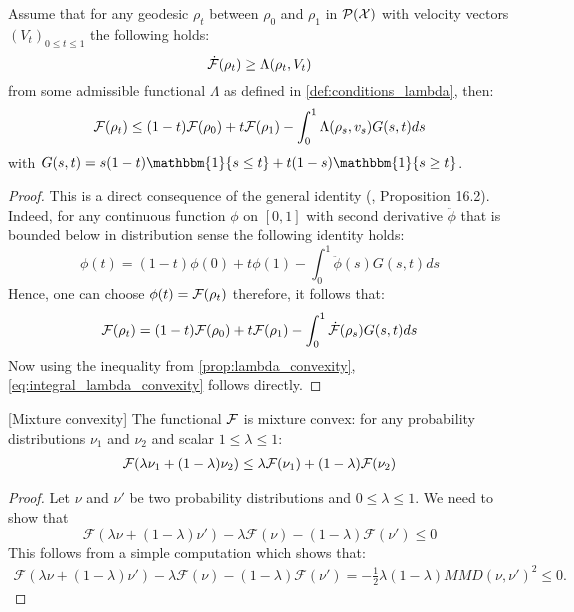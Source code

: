 \begin{lemma}\label{lem:integral_lambda_convexity}
Assume that for any geodesic $\rho_{t}$ between
$\rho_{0}$ and $\rho_{1}$ in $\mathcal{P}({{\mathcal X}})$ with velocity vectors $(V_t)_{0\leq t\leq 1}$ the following holds:
\[
\dot{{{\mathcal F}}}(\rho_{t}) \geq \Lambda(\rho_t,V_t)
\]
from some admissible functional $\Lambda$ as defined in \cref{def:conditions_lambda}, then:
\begin{equation}
{{\mathcal F}}(\rho_{t})\leq(1-t){{\mathcal F}}(\rho_{0})+t{{\mathcal F}}(\rho_{1})-\int_{0}^{1}\Lambda(\rho_{s},v_{s})G(s,t)ds\label{eq:integral_lambda_convexity}
\end{equation}
with $G(s,t)=s(1-t) \mathbbm{1}\{s\leq t\}
+t(1-s) \mathbbm{1}\{s\geq t\}$.

\end{lemma}
\begin{proof}
	This is a direct consequence of the general identity (\cite{Villani:2009},
	Proposition 16.2). Indeed, for any continuous function $\phi$ on
	$[0,1]$ with second derivative $\ddot{\phi}$ that is bounded below
	in distribution sense the following identity holds:
	\[
	\phi(t)=(1-t)\phi(0)+t\phi(1)-\int_{0}^{1}\ddot{\phi}(s)G(s,t)ds
	\]
	Hence, one can choose $\phi(t)={{\mathcal F}}(\rho_{t})$ therefore, 
	it follows that:
	\[
	{{\mathcal F}}(\rho_{t})=(1-t){{\mathcal F}}(\rho_{0})+t{{\mathcal F}}(\rho_{1})-\int_{0}^{1}\dot{{{\mathcal F}}}(\rho_{s})G(s,t)ds
	\]
	Now using the inequality from \cref{prop:lambda_convexity}, \cref{eq:integral_lambda_convexity}
	follows directly. 
\end{proof}


\begin{lemma}\label{lem:mixture_convexity}[Mixture convexity]
	The functional ${{\mathcal F}}$ is mixture convex: for any probability distributions $\nu_1$ and $\nu_2$ and scalar $1\leq \lambda\leq 1$:
	\begin{align*}
	{{\mathcal F}}(\lambda \nu_1+(1-\lambda)\nu_2)\leq \lambda {{\mathcal F}}(\nu_1)+ (1-\lambda){{\mathcal F}}(\nu_2)
	\end{align*}
\end{lemma}
\begin{proof}
	Let $\nu$ and $\nu'$ be two probability distributions and $0\leq \lambda\leq 1$.
	We need to show that \[\mathcal{F}(\lambda \nu + (1-\lambda)\nu') -\lambda \mathcal{F}(\nu) -(1-\lambda)\mathcal{F}(\nu')\leq 0\]
	This follows from a simple computation which shows that:
	\begin{align*}
	\mathcal{F}(\lambda \nu + (1-\lambda)\nu') -\lambda \mathcal{F}(\nu) -(1-\lambda)\mathcal{F}(\nu') = -\frac{1}{2}\lambda(1-\lambda)MMD(\nu,\nu')^2 \leq 0.
	\end{align*}
\end{proof}


